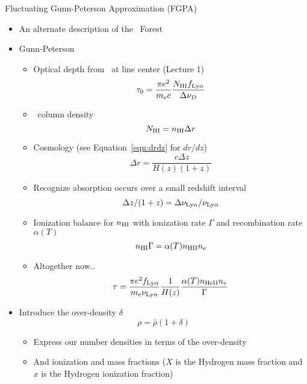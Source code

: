 \documentclass[12pt,letterpaper]{article}
\begin{document}
\begin{Aenumerate}
{\bf \item Fluctuating Gunn-Peterson Approximation (FGPA)}
	\begin{itemize}
	\item An alternate description of the \lya\ Forest
	\item Gunn-Peterson 
		\begin{itemize}
		\item Optical depth from \lya\ at line center (Lecture 1)
		\begin{equation}
		\tau_0 = \frac{\pi e^2}{m_e c} \frac{N_{\rm HI} 
		f_{\rm Ly\alpha}}{\Delta \nu_D}
		\end{equation}
		\item \nhi\ column density
		\begin{equation}
		N_{\rm HI} = n_{\rm HI} \Delta r
		\end{equation}
		\item Cosmology (see Equation~\ref{eqn:drdz} for $dr/dz$)
		\begin{equation}
		\Delta r = \frac{c \Delta z}{H(z) (1+z)}
		\end{equation}
		\item Recognize absorption occurs over a small redshift interval
		\begin{equation}
		\Delta z/(1+z) = \Delta\nu_{\rm Ly\alpha} / \nu_{\rm Ly\alpha}
		\end{equation}
		\item Ionization balance for $n_{\rm HI}$ with ionization rate $\Gamma$
		and recombination rate $\alpha(T)$
		\begin{equation}
		n_{\rm HI} \Gamma = \alpha(T) n_{\rm HII} n_e
		\label{eqn:ion_balance}
		\end{equation}
		\item Altogether now..
		\begin{equation}
		\tau = \frac{\pi e^2 f_{\rm Ly\alpha}}{m_e \nu_{\rm Ly\alpha}}
		\frac{1}{H(z)} \frac{\alpha(T) n_{\rm HeII} n_e}{\Gamma}
		\end{equation}
		\end{itemize}
	\item Introduce the over-density $\delta$
	\begin{equation}
	\rho = \bar\rho (1+\delta)
	\label{eqn:overdensity}
	\end{equation}
		\begin{itemize}
		\item Express our number densities in terms of the over-density
		\item And ionization and mass fractions ($X$ is the Hydrogen mass fraction and $x$ is the Hydrogen ionization fraction)

\end{itemize}
\end{itemize}
\end{Aenumerate}
\end{document}
